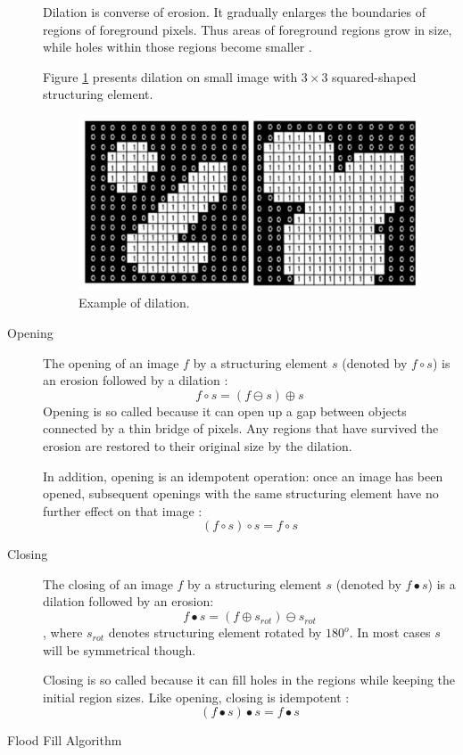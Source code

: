 \documentclass{article}
\begin{document}
\begin{description}
Dilation is converse of erosion. It gradually enlarges the boundaries of regions of foreground pixels. Thus areas of foreground regions grow in size, while holes within those regions become smaller \cite{slajdy_morph}.

Figure \ref{fig:dilation_exampl} presents dilation on small image with $3 \times 3$ squared-shaped structuring element.
\begin{figure}[H]
  \centering
  \includegraphics[width=0.4\linewidth]{_Figures/dilation_example.jpg}
  \caption{Example of dilation.}
  \label{fig:dilation_exampl}
\end{figure}%

%
% 
\item[Opening]
The opening of an image $f$  by a structuring element $s$ (denoted by $f \circ s$) is an erosion followed by a dilation \cite{morphological}: 
\[
f \circ s = (f \ominus s) \oplus s
\]
Opening is so called because it can open up a gap between objects connected by a thin bridge of pixels. Any regions that have survived the erosion are restored to their original size by the dilation.

In addition, opening is an idempotent operation: once an image has been opened, subsequent openings with the same structuring element have no further effect on that image \cite{morphological}:
\[
(f \circ s) \circ s = f \circ s
\]


%
%
\item[Closing] The closing of an image $f$  by a structuring element $s$ (denoted by $f \bullet s$) is a dilation followed by an erosion: 
\[
f \bullet s = (f \oplus s_{rot}) \ominus s_{rot}
\]
, where $s_{rot}$ denotes structuring element rotated by $180^{o}$. In most cases $s$ will be symmetrical though.

Closing is so called because it can fill holes in the regions while keeping the initial region sizes. Like opening, closing is idempotent \cite{morphological}:
\[
(f \bullet s) \bullet s = f \bullet s
\]
%
%
\item[Flood Fill Algorithm]

\end{description} 
\pagebreak
 
\end{document}
